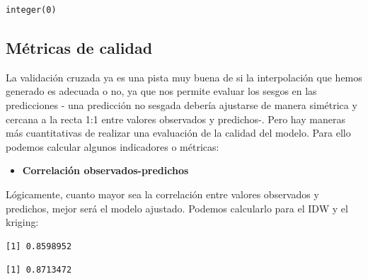 \documentclass[
  letterpaper,
  DIV=11,
  numbers=noendperiod]{scrreprt}
\newenvironment{Shaded}{\begin{snugshade}}{\end{snugshade}}
\newcommand{\CommentTok}[1]{\textcolor[rgb]{0.37,0.37,0.37}{#1}}
\newcommand{\FunctionTok}[1]{\textcolor[rgb]{0.28,0.35,0.67}{#1}}
\newcommand{\NormalTok}[1]{\textcolor[rgb]{0.00,0.23,0.31}{#1}}
\newcommand{\SpecialCharTok}[1]{\textcolor[rgb]{0.37,0.37,0.37}{#1}}
\providecommand{\tightlist}{%
  \setlength{\itemsep}{0pt}\setlength{\parskip}{0pt}}\usepackage{longtable,booktabs,array}
\begin{document}
\begin{verbatim}
integer(0)
\end{verbatim}

\hypertarget{muxe9tricas-de-calidad}{%
\subsection{Métricas de calidad}\label{muxe9tricas-de-calidad}}

La validación cruzada ya es una pista muy buena de si la interpolación
que hemos generado es adecuada o no, ya que nos permite evaluar los
sesgos en las predicciones - una predicción no sesgada debería ajustarse
de manera simétrica y cercana a la recta 1:1 entre valores observados y
predichos-. Pero hay maneras más cuantitativas de realizar una
evaluación de la calidad del modelo. Para ello podemos calcular algunos
indicadores o métricas:

\begin{itemize}
\tightlist
\item
  \textbf{Correlación observados-predichos}
\end{itemize}

Lógicamente, cuanto mayor sea la correlación entre valores observados y
predichos, mejor será el modelo ajustado. Podemos calcularlo para el IDW
y el kriging:

\begin{Shaded}
\end{Shaded}

\begin{verbatim}
[1] 0.8598952
\end{verbatim}

\begin{Shaded}
\end{Shaded}

\begin{verbatim}
[1] 0.8713472
\end{verbatim}

\begin{Shaded}
\end{Shaded}
\end{document}
